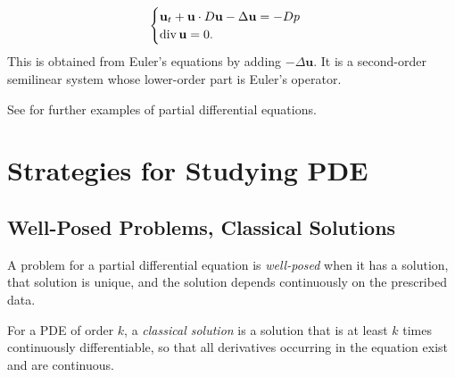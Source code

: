 \begin{example}
\label{ex:navier-stokes-equations-incompressible-viscous}





$$\begin{cases}
\mathbf{u}_t + \mathbf{u} \cdot D\mathbf{u} - \Delta\mathbf{u} = -D p \\
\operatorname{div} \mathbf{u} = 0.
\end{cases}$$
This is obtained from Euler's equations by adding $-\Delta\mathbf{u}$. It is a
second-order semilinear system whose lower-order part is Euler's operator.
\end{example}

See \cite{Zwillinger1984} for further examples of partial differential equations.
\section{Strategies for Studying PDE}
\label{sec:strategies-studying-pde}

\subsection{Well-Posed Problems, Classical Solutions}
\label{sec:well-posed-classical-solutions}

\begin{definition}
\label{def:well-posed-problem}




A problem for a partial differential equation is \textit{well-posed} when it has a solution, that solution is unique, and the solution depends continuously on the prescribed data.
\end{definition}

\begin{definition}
\label{def:classical-solution}





For a PDE of order $k$, a \textit{classical solution} is a solution that is at least $k$ times continuously differentiable, so that all derivatives occurring in the equation exist and are continuous.
\end{definition}


